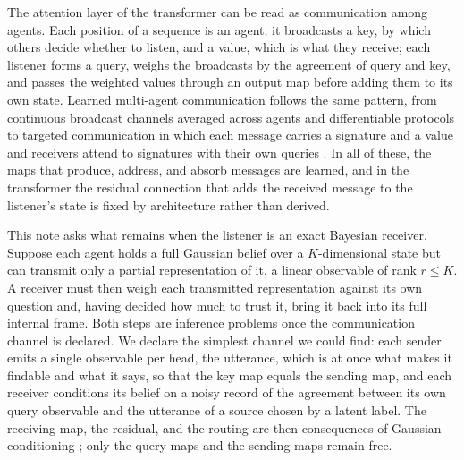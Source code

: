 \documentclass[11pt]{article}
\theoremstyle{definition}
\theoremstyle{remark}
\begin{document}
The attention layer of the transformer \citep{vaswani2017attention} can be read as communication among agents. Each position of a sequence is an agent; it broadcasts a key, by which others decide whether to listen, and a value, which is what they receive; each listener forms a query, weighs the broadcasts by the agreement of query and key, and passes the weighted values through an output map before adding them to its own state. Learned multi-agent communication follows the same pattern, from continuous broadcast channels averaged across agents \citep{Sukhbaatar2016CommNet} and differentiable protocols \citep{foerster2016learning} to targeted communication in which each message carries a signature and a value and receivers attend to signatures with their own queries \citep{Das2019TarMAC}. In all of these, the maps that produce, address, and absorb messages are learned, and in the transformer the residual connection that adds the received message to the listener's state is fixed by architecture rather than derived.

This note asks what remains when the listener is an exact Bayesian receiver. Suppose each agent holds a full Gaussian belief over a $K$-dimensional state but can transmit only a partial representation of it, a linear observable of rank $r\le K$. A receiver must then weigh each transmitted representation against its own question and, having decided how much to trust it, bring it back into its full internal frame. Both steps are inference problems once the communication channel is declared. We declare the simplest channel we could find: each sender emits a single observable per head, the utterance, which is at once what makes it findable and what it says, so that the key map equals the sending map, and each receiver conditions its belief on a noisy record of the agreement between its own query observable and the utterance of a source chosen by a latent label. The receiving map, the residual, and the routing are then consequences of Gaussian conditioning \citep[Sec.~2.3]{Bishop2006}; only the query maps and the sending maps remain free.
\end{document}
